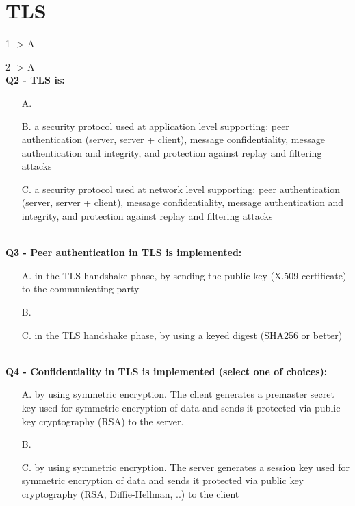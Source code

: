 \section*{TLS}
1 -> A

2 -> A 
\textbf{\\Q2 - TLS is:}
\begin{itemize}
    \item[A.] 
    \item[B.] a security protocol used at application level supporting: peer authentication (server, server + client), message confidentiality, message authentication and integrity, and protection against replay and filtering attacks
    \item[C.] a security protocol used at network level supporting: peer authentication (server, server + client), message confidentiality, message authentication and integrity, and protection against replay and filtering attacks
\end{itemize}
 
\textbf{\\Q3 - Peer authentication in TLS is implemented:}
\begin{itemize}
    \item[A.] in the TLS handshake phase, by sending the public key (X.509 certificate) to the communicating party
    \item[B.] 
    \item[C.] in the TLS handshake phase, by using a keyed digest (SHA256 or better)
\end{itemize}
\com{}

\textbf{\\Q4 - Confidentiality in TLS is implemented (select one of choices):}
\begin{itemize}
    \item[A.] by using symmetric encryption. The client generates a premaster secret key used for symmetric encryption of data and sends it protected via public key cryptography (RSA) to the server.
    \item[B.] 
    \item[C.] by using symmetric encryption. The server generates a session key used for symmetric encryption of data and sends it protected via public key cryptography (RSA, Diffie-Hellman, ..) to the client
\end{itemize}



